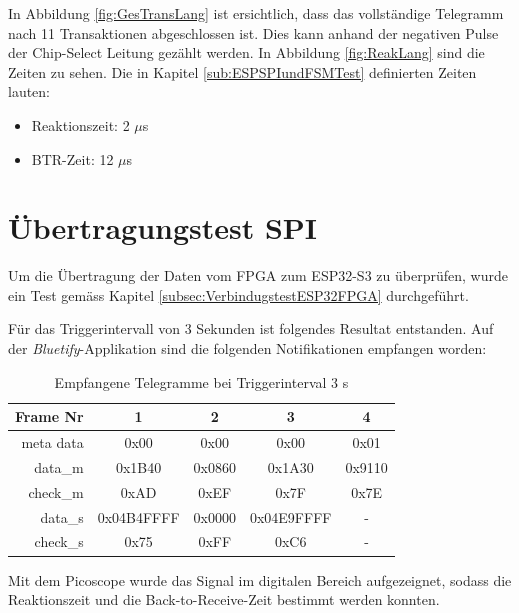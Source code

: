 In Abbildung \ref{fig:GesTransLang} ist ersichtlich, dass das vollständige Telegramm nach 11 Transaktionen abgeschlossen ist. Dies kann anhand der negativen Pulse der Chip-Select Leitung gezählt werden.
In Abbildung \ref{fig:ReakLang} sind die Zeiten zu sehen. Die in Kapitel \ref{sub:ESPSPIundFSMTest} definierten Zeiten lauten:
\begin{itemize}
    \item Reaktionszeit: 2 $\mu$s
    \item BTR-Zeit: 12 $\mu$s
\end{itemize}




\section{Übertragungstest SPI}
\label{sec:ResultatÜbertragungSPI}
Um die Übertragung der Daten vom FPGA zum ESP32-S3 zu überprüfen, wurde ein Test gemäss Kapitel \ref{subsec:VerbindugstestESP32FPGA} durchgeführt.

Für das Triggerintervall von 3 Sekunden ist folgendes Resultat entstanden. Auf der \textit{Bluetify}-Applikation sind die folgenden Notifikationen empfangen worden:

\begin{table}[H]
    \centering
    \begin{tabular}{r||c|c|c|c}
        \hline
        Frame Nr & 1 & 2 & 3 & 4\\ \hline
        meta data & 0x00 & 0x00 & 0x00 & 0x01\\ \hline
        data\_m & 0x1B40 & 0x0860 & 0x1A30 & 0x9110\\ \hline
        check\_m & 0xAD & 0xEF & 0x7F & 0x7E\\ \hline
        data\_s & 0x04B4FFFF & 0x0000 & 0x04E9FFFF & -\\ \hline
        check\_s & 0x75 & 0xFF & 0xC6 & -\\ \hline
    \end{tabular}
    \caption{Empfangene Telegramme bei Triggerinterval 3 s}
    \label{tab:EmpfTeleg3sTrigg}
\end{table}

Mit dem Picoscope wurde das Signal im digitalen Bereich aufgezeignet, sodass die Reaktionszeit und die Back-to-Receive-Zeit bestimmt werden konnten. 

